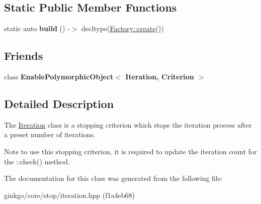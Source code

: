 \subsection*{Static Public Member Functions}
\begin{DoxyCompactItemize}
\item 
\mbox{\label{classgko_1_1stop_1_1Iteration_ae1644e1beb79d560ec9f1e63d147e258}} 
static auto {\bfseries build} () -\/$>$ decltype(\hyperlink{classgko_1_1EnableDefaultFactory_a1d077101d9e788e6c65f088612d14cc3}{Factory\+::create}())
\end{DoxyCompactItemize}
\subsection*{Friends}
\begin{DoxyCompactItemize}
\item 
\mbox{\label{classgko_1_1stop_1_1Iteration_a53441469892d9e127b487d868cd90aee}} 
class {\bfseries Enable\+Polymorphic\+Object$<$ Iteration, Criterion $>$}
\end{DoxyCompactItemize}


\subsection{Detailed Description}
The \hyperlink{classgko_1_1stop_1_1Iteration}{Iteration} class is a stopping criterion which stops the iteration process after a preset number of iterations. 

\begin{DoxyNote}{Note}
to use this stopping criterion, it is required to update the iteration count for the \+::check() method. 
\end{DoxyNote}


The documentation for this class was generated from the following file\+:\begin{DoxyCompactItemize}
\item 
ginkgo/core/stop/iteration.\+hpp (f1a4eb68)\end{DoxyCompactItemize}
